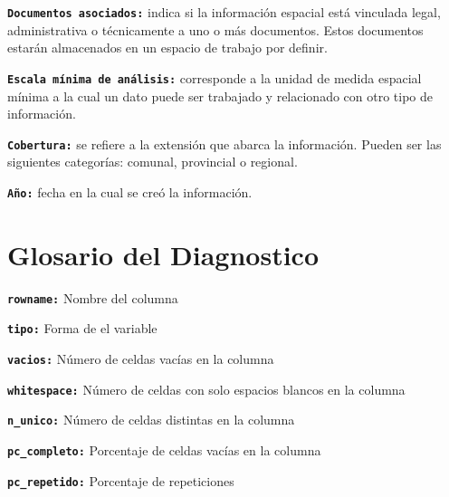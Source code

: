 \documentclass[
]{book}
\theoremstyle{definition}
\theoremstyle{definition}
\theoremstyle{definition}
\theoremstyle{definition}
\theoremstyle{remark}
\begin{document}
\textbf{\texttt{Documentos\ asociados:}} indica si la información espacial está vinculada legal, administrativa o técnicamente a uno o más documentos. Estos documentos estarán almacenados en un espacio de trabajo por definir.

\textbf{\texttt{Escala\ mínima\ de\ análisis:}} corresponde a la unidad de medida espacial mínima a la cual un dato puede ser trabajado y relacionado con otro tipo de información.

\textbf{\texttt{Cobertura:}} se refiere a la extensión que abarca la información. Pueden ser las siguientes categorías: comunal, provincial o regional.

\textbf{\texttt{Año:}} fecha en la cual se creó la información.

\hypertarget{glosario-del-diagnostico}{%
\section*{Glosario del Diagnostico}\label{glosario-del-diagnostico}}

\textbf{\texttt{rowname:}} Nombre del columna

\textbf{\texttt{tipo:}} Forma de el variable

\textbf{\texttt{vacios:}} Número de celdas vacías en la columna

\textbf{\texttt{whitespace:}} Número de celdas con solo espacios blancos en la columna

\textbf{\texttt{n\_unico:}} Número de celdas distintas en la columna

\textbf{\texttt{pc\_completo:}} Porcentaje de celdas vacías en la columna

\textbf{\texttt{pc\_repetido:}} Porcentaje de repeticiones
\end{document}
